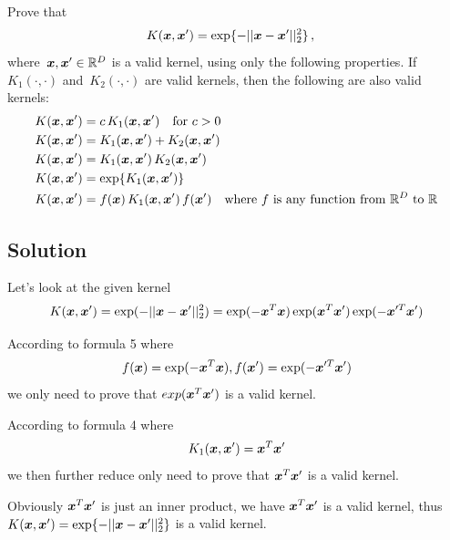 \documentclass[submit]{harvardml}
\begin{document}
\newpage
\begin{problem}
Prove that
\begin{align*}
	K(\boldsymbol{x}, \boldsymbol{x}') &= \exp\{ -||\boldsymbol{x} - \boldsymbol{x}'||^2_2 \}\,,
\end{align*}
where~$\boldsymbol{x},\boldsymbol{x}'\in\mathbb{R}^D$ is a valid kernel, using only the following
properties.  If~$K_1(\cdot,\cdot)$ and~$K_2(\cdot,\cdot)$ are valid kernels,
then the following are also valid kernels:
\begin{align*}
	K(\boldsymbol{x}, \boldsymbol{x}') &= c\,K_1(\boldsymbol{x}, \boldsymbol{x}') \quad \text{for $c>0$}\\
	K(\boldsymbol{x}, \boldsymbol{x}') &= K_1(\boldsymbol{x}, \boldsymbol{x}') + K_2(\boldsymbol{x}, \boldsymbol{x}')\\
	K(\boldsymbol{x}, \boldsymbol{x}') &= K_1(\boldsymbol{x}, \boldsymbol{x}')\,K_2(\boldsymbol{x}, \boldsymbol{x}')\\
	K(\boldsymbol{x}, \boldsymbol{x}') &= \exp\{ K_1(\boldsymbol{x}, \boldsymbol{x}') \}\\
  K(\boldsymbol{x}, \boldsymbol{x}') &= f(\boldsymbol{x})\,K_1(\boldsymbol{x}, \boldsymbol{x}')\,f(\boldsymbol{x}') \quad
  \text{where $f$ is any function from~$\mathbb{R}^D$ to $\mathbb{R}$}
\end{align*}

 \end{problem}
\subsection*{Solution}

Let's look at the given kernel
$$ K(\boldsymbol{x},\boldsymbol{x}') = \exp({-||\boldsymbol{x} - \boldsymbol{x}'||^2_2})
 = \exp(-\boldsymbol{x}^T\boldsymbol{x})\exp(\boldsymbol{x}^T\boldsymbol{x}')\exp(-\boldsymbol{x}'^T\boldsymbol{x}') $$

According to formula 5 where
$$ f(\boldsymbol{x}) = \exp(-\boldsymbol{x}^T\boldsymbol{x}), f(\boldsymbol{x}') = \exp(-\boldsymbol{x}'^T\boldsymbol{x}') $$
we only need to prove that $exp(\boldsymbol{x}^T\boldsymbol{x}')$ is a valid kernel.

According to formula 4 where 
$$ K_1(\boldsymbol{x}, \boldsymbol{x}') = \boldsymbol{x}^T\boldsymbol{x}'$$
we then further reduce only need to prove that $\boldsymbol{x}^T\boldsymbol{x}'$ is a valid kernel. 

Obviously $\boldsymbol{x}^T\boldsymbol{x}'$ is just an inner product, we have $\boldsymbol{x}^T\boldsymbol{x}'$ is a valid kernel, thus $K(\boldsymbol{x}, \boldsymbol{x}') = \exp\{ -||\boldsymbol{x} - \boldsymbol{x}'||^2_2 \}$ is a valid kernel.
\end{document}

